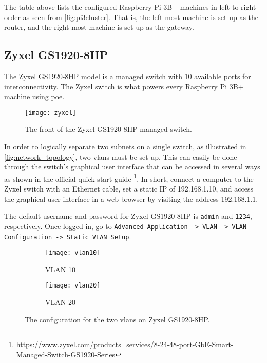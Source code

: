 The table above lists the configured Raspberry Pi 3B+ machines in left to right order as seen from \ref{fig:pi3cluster}. That is, the left most machine is set up as the router, and the right most machine is set up as the gateway.




\subsection{Zyxel GS1920-8HP} \label{zyxel}

The Zyxel GS1920-8HP model is a managed switch with 10 available ports for interconnectivity. The Zyxel switch is what powers every Raspberry Pi 3B+ machine using \gls{poe}.

\begin{figure}[H]
    \centering
    \texttt{[image: zyxel]}
    \captionsetup{width=1.0\linewidth}
    \caption{The front of the Zyxel GS1920-8HP managed switch.}
    \label{fig:zyxel}
\end{figure}

In order to logically separate two subnets on a single switch, as illustrated in \ref{fig:network_topology}, two \gls{vlan}s must be set up. This can easily be done through the switch's graphical user interface that can be accessed in several ways as shown in the official \href{https://www.zyxel.com/support/download_landing/product/gs1920_series_18.shtml?c=gb&l=en&pid=20130521174252&tab=Quick_Start_Guide&pname=GS1920%20Series}{quick start guide} \footnote{\url{https://www.zyxel.com/products_services/8-24-48-port-GbE-Smart-Managed-Switch-GS1920-Series}}. In short, connect a computer to the Zyxel switch with an Ethernet cable, set a static IP of 192.168.1.10, and access the graphical user interface in a web browser by visiting the address 192.168.1.1.

The default username and password for Zyxel GS1920-8HP is \lstinline{admin} and \lstinline{1234}, respectively. Once logged in, go to \lstinline{Advanced Application -> VLAN -> VLAN Configuration -> Static VLAN Setup}.

\begin{figure}[H]
    \centering
    \begin{subfigure}{0.5\linewidth}
        \centering
        \texttt{[image: vlan10]}
        \caption{VLAN 10}
        \label{fig:vlan10}
    \end{subfigure}%
    \begin{subfigure}{0.5\linewidth}
        \centering
        \texttt{[image: vlan20]}
        \caption{VLAN 20}
        \label{fig:vlan20}
    \end{subfigure}
    \caption{The configuration for the two \gls{vlan}s on Zyxel GS1920-8HP.}
    \label{fig:vlans}
\end{figure}

